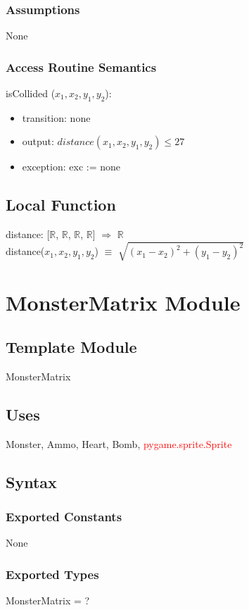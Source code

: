 \documentclass[12pt]{article}
\begin{document}
\subsubsection*{Assumptions}
None
\subsubsection*{Access Routine Semantics}
\noindent isCollided ($x_1, x_2, y_1, y_2$):
\begin{itemize}
\item transition: none
\item output: $distance(x_1, x_2, y_1, y_2) \leq 27$
\item exception: exc := none
\end{itemize}

\subsection*{Local Function}
distance: [$\mathbb{R}$, $\mathbb{R}$, $\mathbb{R}$, $\mathbb{R}$] $\Rightarrow$ $\mathbb{R}$\\
distance($x_1, x_2, y_1, y_2$) $\equiv$ $\sqrt{(x_1 - x_2)^2 + (y_1 - y_2)^2}$
\newpage

\section{MonsterMatrix Module}

\subsection*{Template Module}
MonsterMatrix

\subsection*{Uses}
Monster, Ammo, Heart, Bomb, \textcolor{red}{pygame.sprite.Sprite}
\subsection*{Syntax}
\subsubsection*{Exported Constants}
None
\subsubsection*{Exported Types}
MonsterMatrix = ?
\end{document}
